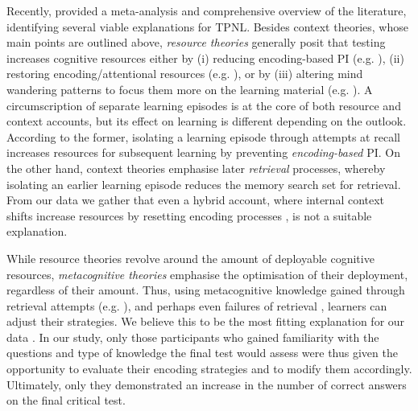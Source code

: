 \documentclass[../main.tex]{subfiles}
\begin{document}
Recently, \cite{chanRetrievalPotentiatesNew2018} provided a meta-analysis 
and comprehensive overview of the literature, identifying several 
viable explanations for TPNL. Besides context theories, whose main points 
are outlined above, \textit{resource theories} generally posit that testing 
increases cognitive resources either by (i) reducing encoding-based PI (e.g. 
\citealp{wahlheimTestingCanCounteract2015, 
	weinsteinTestingProtectsProactive2011, szpunarTestingStudyInsulates2008, 
	nunesTestingImprovesTrue2012}), (ii) restoring encoding/attentional 
resources (e.g. \citealp{pastotterRetrievalLearningFacilitates2011}), or by 
(iii) altering mind wandering patterns to focus them more on the learning 
material (e.g. \citealp{jingInterpolatedTestingInfluences2016, 
	szpunarInterpolatedMemoryTests2013,szpunarMindWanderingEducation2013}).
A circumscription of separate learning episodes is at the core of both 
resource and context accounts, but its effect on learning is different 
depending on the outlook. According to the former, isolating a learning 
episode through attempts at recall increases resources for subsequent 
learning by preventing \textit{encoding-based} PI. On the other hand, 
context theories emphasise later \textit{retrieval} processes, whereby 
isolating an earlier learning episode reduces the memory search set for 
retrieval. From our data we gather that even a hybrid account, where 
internal context shifts increase resources by resetting encoding processes 
\citep{pastotterRetrievalLearningFacilitates2011}, is not a suitable 
explanation.

While resource theories revolve around the amount of deployable cognitive 
resources, \textit{metacognitive theories} emphasise the optimisation of 
their deployment, regardless of their amount. Thus, using metacognitive 
knowledge gained through retrieval attempts (e.g. 
\citealp{choTestingEnhancesBoth2017, 
	chanTestingPotentiatesNew2018}), and perhaps even failures of retrieval 
\citep{bahrickImportanceRetrievalFailures2005}, learners can adjust their 
strategies. We believe this to be the most fitting explanation for our data 
\citep{wissmanInterimTestEffect2011, 
	chanTestingPotentiatesNew2018}. In our study, only those participants
who gained familiarity with the questions and type of knowledge the final 
test would assess were thus given the opportunity to evaluate their encoding 
strategies and to modify them accordingly. Ultimately, only they 
demonstrated an increase in the number of correct answers on the final 
critical test. 
\end{document}
